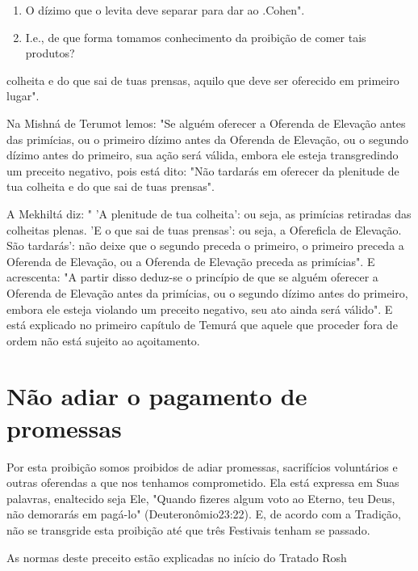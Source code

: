 \begin{enumerate}
\def\labelenumi{\arabic{enumi}.}
\setcounter{enumi}{317}
\item
 
 O dízimo que o levita deve separar para dar ao
 .Cohen".
 
\item
 
 I.e., de que forma tomamos conhecimento da proibição de comer tais
 produtos?
 
\end{enumerate}

colheita e do que sai de tuas prensas, aquilo que deve ser oferecido em
primei­ro lugar".

Na Mishná de Terumot lemos: "Se alguém oferecer a Oferenda de Elevação
antes das primícias, ou o primeiro dízimo antes da Oferenda de
Eleva­ção, ou o segundo dízimo antes do primeiro, sua ação será válida,
embora ele esteja transgredindo um preceito negativo, pois está dito:
"Não tardarás em ofe­recer da plenitude de tua colheita e do que sai de
tuas prensas".

A Mekhiltá diz: " 'A plenitude de tua colheita': ou seja, as primícias
retiradas das colheitas plenas. 'E o que sai de tuas prensas': ou seja,
a Ofereficla de Elevação. São tardarás': não deixe que o segundo preceda
o primeiro, o primeiro preceda a Oferenda de Elevação, ou a Oferenda de
Elevação preceda as primícias". E acrescenta: "A partir disso deduz-se o
princípio de que se al­guém oferecer a Oferenda de Elevação antes da
primícias, ou o segundo dízi­mo antes do primeiro, embora ele esteja
violando um preceito negativo, seu ato ainda será válido". E está
explicado no primeiro capítulo de Temurá que aquele que proceder fora de
ordem não está sujeito ao açoitamento.

\section{Não adiar o pagamento de promessas}

Por esta proibição somos proibidos de adiar promessas, sacrifícios
voluntários e outras oferendas a que nos tenhamos comprometido. Ela está
ex­pressa em Suas palavras, enaltecido seja Ele, "Quando fizeres algum
voto ao Eterno, teu Deus, não demorarás em pagá-lo" (Deuteronômio23:22).
E, de acor­do com a Tradição, não se transgride esta proibição até que
três Festivais te­nham se passado.


As normas deste preceito estão explicadas no início do Tratado Rosh


